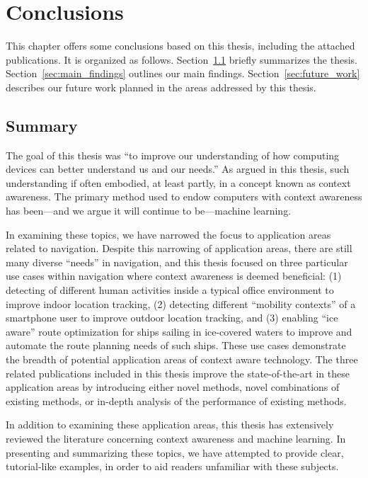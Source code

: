\chapter{Conclusions}
\label{ch:conclusions}

This chapter offers some conclusions based on this thesis, including the attached publications. It is organized as follows. Section~\ref{sec:summary} briefly summarizes the thesis. Section~\ref{sec:main_findings} outlines our main findings. Section~\ref{sec:future_work} describes our future work planned in the areas addressed by this thesis.

\section{Summary}
\label{sec:summary}

The goal of this thesis was ``to improve our understanding of how computing devices can better understand us and our needs.'' As argued in this thesis, such understanding if often embodied, at least partly, in a concept known as context awareness. The primary method used to endow computers with context awareness has been---and we argue it will continue to be---machine learning. 

In examining these topics, we have narrowed the focus to application areas related to navigation. Despite this narrowing of application areas, there are still many diverse ``needs'' in navigation, and this thesis focused on three particular use cases within navigation where context awareness is deemed beneficial: (1) detecting of different human activities inside a typical office environment to improve indoor location tracking, (2) detecting different ``mobility contexts'' of a smartphone user to improve outdoor location tracking, and (3) enabling ``ice aware'' route optimization for ships sailing in ice-covered waters to improve and automate the route planning needs of such ships. These use cases demonstrate the breadth of potential application areas of context aware technology. The three related publications included in this thesis improve the state-of-the-art in these application areas by introducing either novel methods, novel combinations of existing methods, or in-depth analysis of the performance of existing methods.

In addition to examining these application areas, this thesis has extensively reviewed the literature concerning context awareness and machine learning. In presenting and summarizing these topics, we have attempted to provide clear, tutorial-like examples, in order to aid readers unfamiliar with these subjects.

